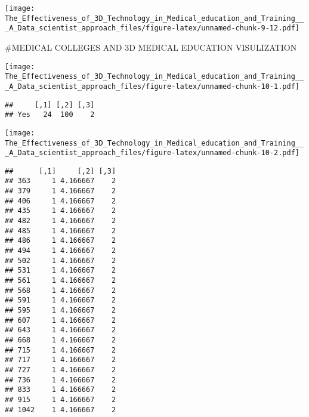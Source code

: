 \documentclass[]{article}
\newenvironment{Shaded}{\begin{snugshade}}{\end{snugshade}}
\newcommand{\DataTypeTok}[1]{\textcolor[rgb]{0.13,0.29,0.53}{#1}}
\newcommand{\KeywordTok}[1]{\textcolor[rgb]{0.13,0.29,0.53}{\textbf{#1}}}
\newcommand{\NormalTok}[1]{#1}
\newcommand{\OperatorTok}[1]{\textcolor[rgb]{0.81,0.36,0.00}{\textbf{#1}}}
\newcommand{\StringTok}[1]{\textcolor[rgb]{0.31,0.60,0.02}{#1}}
\begin{document}
\texttt{[image: The\_Effectiveness\_of\_3D\_Technology\_in\_Medical\_education\_and\_Training\_\_\_A\_Data\_scientist\_approach\_files/figure-latex/unnamed-chunk-9-12.pdf]}

\#MEDICAL COLLEGES AND 3D MEDICAL EDUCATION VISULIZATION

\begin{Shaded}
\end{Shaded}

\texttt{[image: The\_Effectiveness\_of\_3D\_Technology\_in\_Medical\_education\_and\_Training\_\_\_A\_Data\_scientist\_approach\_files/figure-latex/unnamed-chunk-10-1.pdf]}

\begin{verbatim}
##     [,1] [,2] [,3]
## Yes   24  100    2
\end{verbatim}

\begin{Shaded}
\end{Shaded}

\texttt{[image: The\_Effectiveness\_of\_3D\_Technology\_in\_Medical\_education\_and\_Training\_\_\_A\_Data\_scientist\_approach\_files/figure-latex/unnamed-chunk-10-2.pdf]}

\begin{verbatim}
##      [,1]     [,2] [,3]
## 363     1 4.166667    2
## 379     1 4.166667    2
## 406     1 4.166667    2
## 435     1 4.166667    2
## 482     1 4.166667    2
## 485     1 4.166667    2
## 486     1 4.166667    2
## 494     1 4.166667    2
## 502     1 4.166667    2
## 531     1 4.166667    2
## 561     1 4.166667    2
## 568     1 4.166667    2
## 591     1 4.166667    2
## 595     1 4.166667    2
## 607     1 4.166667    2
## 643     1 4.166667    2
## 668     1 4.166667    2
## 715     1 4.166667    2
## 717     1 4.166667    2
## 727     1 4.166667    2
## 736     1 4.166667    2
## 833     1 4.166667    2
## 915     1 4.166667    2
## 1042    1 4.166667    2
\end{verbatim}
\end{document}

